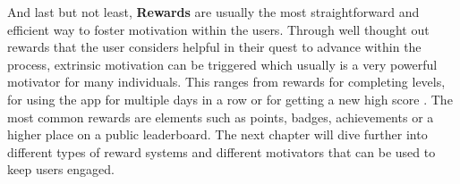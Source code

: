 And last but not least, \textbf{Rewards} are usually the most straightforward and efficient way to foster motivation within the users. Through well thought out rewards that the user considers helpful in their quest to advance within the process, extrinsic motivation can be triggered which usually is a very powerful motivator for many individuals. This ranges from rewards for completing levels, for using the app for multiple days in a row or for getting a new high score \cite{fail}. The most common rewards are elements such as points, badges, achievements or a higher place on a public leaderboard.
The next chapter will dive further into different types of reward systems and different motivators that can be used to keep users engaged.